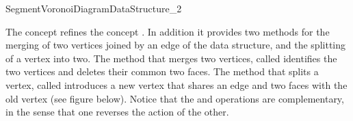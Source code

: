 


\begin{ccRefConcept}{SegmentVoronoiDiagramDataStructure_2}

\ccDefinition

The concept  refines the
concept . In addition
it provides two methods for the merging of two vertices joined by an
edge of the data structure, and the splitting of a vertex into two.
The method that merges two vertices, called 
identifies the two vertices and deletes their common two faces. The
method that splits a vertex, called  introduces a
new vertex that shares an edge and two faces with the old vertex (see
figure below). Notice that the  and
 operations are complementary, in the sense that one
reverses the action of the other.


\end{ccRefConcept}
